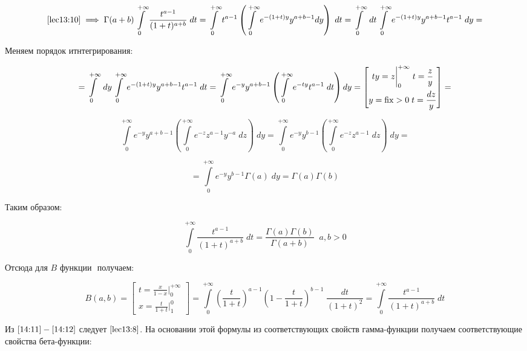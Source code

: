 \documentclass[../../main.tex]{subfiles}
\begin{document}
\[ \eqref{lec13:10} \implies \Gamma (a+b) \int\limits_{0}^{+\infty} \frac{ 
t^{a-1} }{ (1+t)^{a+b} } \; dt = \int\limits_{0}^{+\infty} t^{a-1} \left(  
\int\limits_{0}^{+\infty} e^{-(1+t)y } y^{a+b-1} dy \right) \; dt =  
\int\limits_{0}^{+\infty} \; dt  \int\limits_{0}^{+\infty} e^{ -(1+t)y } 
y^{a+b-1}  t^{a-1} \; dy = \]

Меняем порядок итнтегрирования:

\[ =  \int\limits_{0}^{+\infty} \; dy \int\limits_{0}^{+\infty} e^{ -(1+t)y } 
y^{a+b-1} t^{a-1} \; dt  = \int\limits_{0}^{+\infty} e^{-y} y^{a+b-1} \left( 
\int\limits_{0}^{+\infty} e^{-ty} t^{a-1} \; dt \right) dy = \left[  
\begin{gathered}
									ty = z \bigg|_{0}^{+\infty} \; t = \frac{z}{y}\\
									y = \operatorname{fix} > 0 \; t = \frac{dz}{y} 
										\end{gathered} \right] =   \]

\[  \int\limits_{0}^{+\infty} e^{-y} y^{a+b-1} \left( 
\int\limits_{0}^{+\infty} e^{-z} z^{a-1} y^{-a}  \; dz   \right) \; dy = 
\int\limits_{0}^{+\infty} e^{-y} y^{b-1} \left( \int\limits_{0}^{+\infty} 
e^{-z} z^{a-1}  \; dz \right) \; dy  =  \]


\[ = \int\limits_{0}^{+\infty} e^{-y} y^{b-1} \Gamma(a) \; dy = \Gamma(a) 
\Gamma(b)  \]

Таким образом:

\begin{equation}
	\label{14:11}
	\int\limits_{0}^{+\infty} \frac{ t^{a-1} }{ (1+t)^{a+b} } \; dt = 
	\frac{\Gamma(a) \Gamma(b)}{\Gamma(a+b)} \; \; a,b > 0
\end{equation}

Отсюда для $B$ функции $\label{13:6}$ получаем: 

\begin{equation}
\label{14:12}
   B(a,b) = \left[  \begin{gathered}
t = \frac{x}{1-x} \bigg|_{0}^{+\infty}\\
x = \frac{t}{1+t}  \bigg|_{1}^{0} 
\end{gathered}   \right]   = \int\limits_{0}^{+\infty} \left(  \frac{t}{1+t} 
\right)^{a-1} \left(1 - \frac{t}{1+t} \right)^{b-1} \; \frac{dt}{\left( 1+t 
\right)^2} = \int\limits_{0}^{+\infty} \frac{t^{a-1}}{\left( 1+t 
\right)^{a+b}} \; dt 
\end{equation}

Из  $\eqref{14:11} - \eqref{14:12}$ следует $\eqref{lec13:8}$. На основании 
этой формулы из соответствующих свойств гамма-функции получаем соответствующие 
свойства бета-функции:
\end{document}
